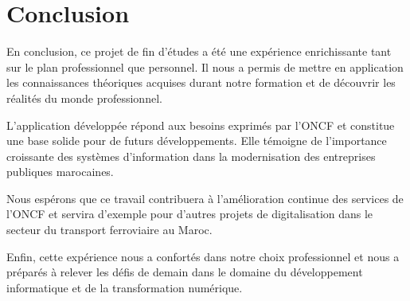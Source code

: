 \section*{Conclusion}

En conclusion, ce projet de fin d'études a été une expérience enrichissante tant sur le plan professionnel que personnel. Il nous a permis de mettre en application les connaissances théoriques acquises durant notre formation et de découvrir les réalités du monde professionnel.

L'application développée répond aux besoins exprimés par l'ONCF et constitue une base solide pour de futurs développements. Elle témoigne de l'importance croissante des systèmes d'information dans la modernisation des entreprises publiques marocaines.

Nous espérons que ce travail contribuera à l'amélioration continue des services de l'ONCF et servira d'exemple pour d'autres projets de digitalisation dans le secteur du transport ferroviaire au Maroc.

Enfin, cette expérience nous a confortés dans notre choix professionnel et nous a préparés à relever les défis de demain dans le domaine du développement informatique et de la transformation numérique.

\vfill

\newpage